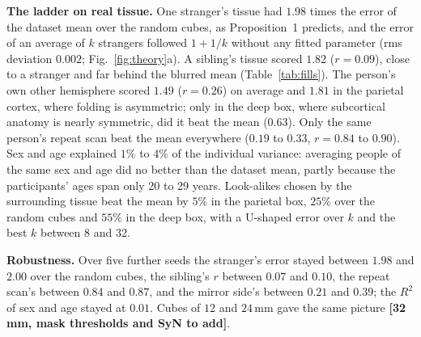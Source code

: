 \documentclass{article}
\newcommand{\todo}[1]{\textbf{[#1]}}
\begin{document}
\textbf{The ladder on real tissue.} One stranger's tissue had $1.98$ times the error of the dataset mean over the random cubes, as Proposition~1 predicts, and the error of an average of $k$ strangers followed $1+1/k$ without any fitted parameter (rms deviation $0.002$; Fig.~\ref{fig:theory}a).
A sibling's tissue scored $1.82$ ($r=0.09$), close to a stranger and far behind the blurred mean (Table~\ref{tab:fills}).
The person's own other hemisphere scored $1.49$ ($r=0.26$) on average and $1.81$ in the parietal cortex, where folding is asymmetric; only in the deep box, where subcortical anatomy is nearly symmetric, did it beat the mean ($0.63$).
Only the same person's repeat scan beat the mean everywhere ($0.19$ to $0.33$, $r=0.84$ to $0.90$).
Sex and age explained $1\%$ to $4\%$ of the individual variance: averaging people of the same sex and age did no better than the dataset mean, partly because the participants' ages span only 20 to 29 years.
Look-alikes chosen by the surrounding tissue beat the mean by $5\%$ in the parietal box, $25\%$ over the random cubes and $55\%$ in the deep box, with a U-shaped error over $k$ and the best $k$ between 8 and 32.

\textbf{Robustness.} Over five further seeds the stranger's error stayed between $1.98$ and $2.00$ over the random cubes, the sibling's $r$ between $0.07$ and $0.10$, the repeat scan's between $0.84$ and $0.87$, and the mirror side's between $0.21$ and $0.39$; the $R^2$ of sex and age stayed at $0.01$.
Cubes of $12$ and $24$\,mm gave the same picture \todo{32\,mm, mask thresholds and SyN to add}.
\end{document}
